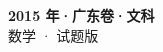 \documentclass[zihao=-4, a4paper]{ctexart}
\begin{document}
\begin{center}
  {\Large\bfseries 2015 年·广东卷·文科}\\[4pt]
  {\large 数学 · 试题版}
\end{center}
\medskip
{}

\end{document}
